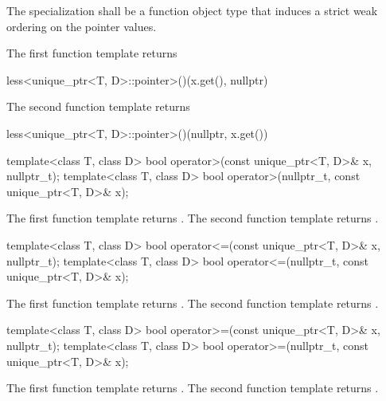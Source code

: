 \begin{itemdescr}
\pnum
\requires The specialization  shall be
a function object type that induces a strict weak
ordering on the pointer values.

\pnum
\returns
The first function template returns
\begin{codeblock}
less<unique_ptr<T, D>::pointer>()(x.get(), nullptr)
\end{codeblock}
The second function template returns
\begin{codeblock}
less<unique_ptr<T, D>::pointer>()(nullptr, x.get())
\end{codeblock}
\end{itemdescr}

%
\begin{itemdecl}
template<class T, class D>
  bool operator>(const unique_ptr<T, D>& x, nullptr_t);
template<class T, class D>
  bool operator>(nullptr_t, const unique_ptr<T, D>& x);
\end{itemdecl}

\begin{itemdescr}
\pnum
\returns
The first function template returns .
The second function template returns .
\end{itemdescr}

%
\begin{itemdecl}
template<class T, class D>
  bool operator<=(const unique_ptr<T, D>& x, nullptr_t);
template<class T, class D>
  bool operator<=(nullptr_t, const unique_ptr<T, D>& x);
\end{itemdecl}

\begin{itemdescr}
\pnum
\returns
The first function template returns .
The second function template returns .
\end{itemdescr}

%
\begin{itemdecl}
template<class T, class D>
  bool operator>=(const unique_ptr<T, D>& x, nullptr_t);
template<class T, class D>
  bool operator>=(nullptr_t, const unique_ptr<T, D>& x);
\end{itemdecl}

\begin{itemdescr}
\pnum
\returns
The first function template returns .
The second function template returns .
\end{itemdescr}

